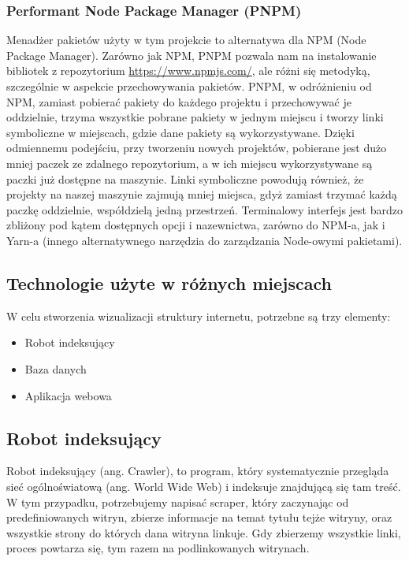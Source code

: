 \documentclass[a4paper, 12pt]{article}
\begin{document}
\subsubsection{Performant Node Package Manager (PNPM)}
Menadżer pakietów użyty w tym projekcie to alternatywa dla NPM (Node Package Manager). Zarówno jak NPM, PNPM pozwala nam na instalowanie bibliotek z repozytorium \url{https://www.npmjs.com/}, ale różni się metodyką, szczególnie w aspekcie przechowywania pakietów. PNPM, w odróżnieniu od NPM, zamiast pobierać pakiety do każdego projektu i przechowywać je oddzielnie, trzyma wszystkie pobrane pakiety w jednym miejscu i tworzy linki symboliczne w miejscach, gdzie dane pakiety są wykorzystywane.\cite{introPnpmDoc} Dzięki odmiennemu podejściu, przy tworzeniu nowych projektów, pobierane jest dużo mniej paczek ze zdalnego repozytorium, a w ich miejscu wykorzystywane są paczki już dostępne na maszynie. Linki symboliczne powodują również, że projekty na naszej maszynie zajmują mniej miejsca, gdyż zamiast trzymać każdą paczkę oddzielnie, współdzielą jedną przestrzeń. Terminalowy interfejs jest bardzo zbliżony pod kątem dostępnych opcji i nazewnictwa, zarówno do NPM-a, jak i Yarn-a (innego alternatywnego narzędzia do zarządzania Node-owymi pakietami).

\subsection{Technologie użyte w różnych miejscach}
W celu stworzenia wizualizacji struktury internetu, potrzebne są trzy elementy:
\begin{itemize}
  \item Robot indeksujący
  \item Baza danych
  \item Aplikacja webowa
\end{itemize}

\subsection{Robot indeksujący}
Robot indeksujący (ang. Crawler), to program, który systematycznie przegląda sieć ogólnoświatową (ang. World Wide Web) i indeksuje znajdującą się tam treść.\cite{cloudflareWebCrawler}\cite{wikiWebCrawler} W tym przypadku, potrzebujemy napisać scraper, który zaczynając od predefiniowanych witryn, zbierze informacje na temat tytułu tejże witryny, oraz wszystkie strony do których dana witryna linkuje. Gdy zbierzemy wszystkie linki, proces powtarza się, tym razem na podlinkowanych witrynach.
\end{document}
